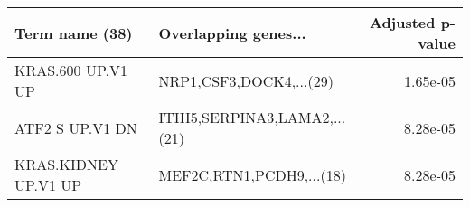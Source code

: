\begin{tabular}{llr}
\toprule
      Term name (38) &         Overlapping genes... &  Adjusted p-value \\
\midrule
   KRAS.600 UP.V1 UP &      NRP1,CSF3,DOCK4,...(29) &          1.65e-05 \\
     ATF2 S UP.V1 DN & ITIH5,SERPINA3,LAMA2,...(21) &          8.28e-05 \\
KRAS.KIDNEY UP.V1 UP &     MEF2C,RTN1,PCDH9,...(18) &          8.28e-05 \\
\bottomrule
\end{tabular}
